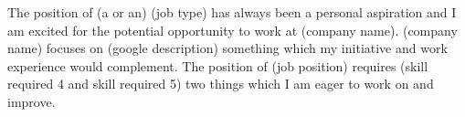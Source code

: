 The position of (a or an) (job type) has always been a personal aspiration and I am excited for the potential opportunity to work at (company name).  (company name) focuses on (google description) something which my initiative and work experience would complement. The position of (job position) requires (skill required 4 and skill required 5) two things which I am eager to work on and improve.
 